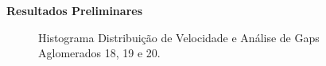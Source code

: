 \documentclass[xcolor=dvipsnames,10pt]{beamer}
\begin{document}
\begin{frame}{\textbf{Resultados Preliminares}}
\begin{figure}[!htbp]
    \caption{Histograma Distribuição de Velocidade e Análise de Gaps Aglomerados 18, 19 e 20.}
  \end{figure}
\end{frame}
\end{document}
